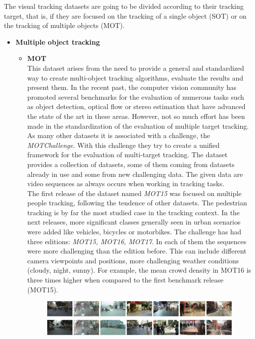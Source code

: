 \documentclass{bmvc2k}
\begin{document}
The visual tracking datasets are going to be divided according to their tracking target, that is, if they are focused on the tracking of a single object (SOT) or on the tracking of multiple objects (MOT).
\begin{itemize}
\item \textbf{Multiple object tracking}
\begin{itemize}
\item \textbf{MOT} ~\cite{milan2016mot16}\\
This dataset arises from the need to provide a general and standardized way to create multi-object tracking algorithms, evaluate the results and present them. In the recent past, the computer vision community has promoted several benchmarks for the evaluation of numerous tasks such as object detection, optical flow or stereo estimation that have advanced the state of the art in these areas. However, not so much effort has been made in the standardization of the evaluation of multiple target tracking.\\
As many other datasets it is associated with a challenge, the \textit{MOTChallenge}. With this challenge they try to create a unified framework for the evaluation of multi-target tracking. The dataset provides a collection of datasets, some of them coming from datasets already in use and some from new challenging data. The given data are video sequences as always occurs when working in tracking tasks.\\
The first release of the dataset named \textit{MOT15} was focused on multiple people tracking, following the tendence of other datasets. The pedestrian tracking is by far the most studied case in the tracking context. In the next releases, more significant classes generally seen in urban scenarios were added like vehicles, bicycles or motorbikes. The challenge has had three editions: \textit{MOT15, MOT16, MOT17}. In each of them the sequences were more challenging than the edition before. This can include different camera viewpoints and positions, more challenging weather conditions (cloudy, night, sunny). For example, the mean crowd density in MOT16 is three times higher when compared to the first benchmark release (MOT15).
\begin{figure}[h!]
\begin{center}
\includegraphics[scale=0.3]{mot16.png}

\end{center}
\end{figure}
\end{itemize}
\end{itemize}
\end{document}
